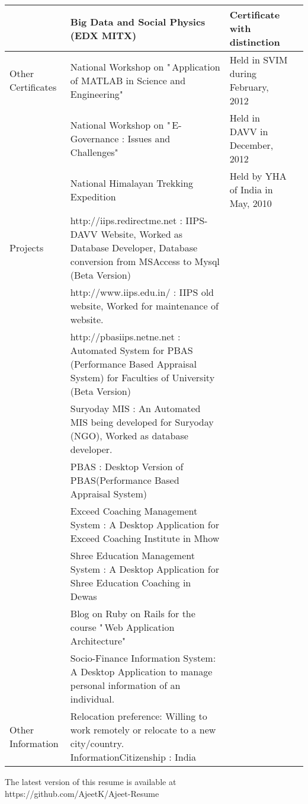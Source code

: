 \documentclass[12pt,a4paper]{article}
\begin{document}
\begin{table}[h]
\begin{tabular}{|l|l|l|l|}
\\
\hline
 & Big Data and Social Physics (EDX MITX) & Certificate with distinction 
\\
\hline
Other Certificates & National Workshop on "\,Application of MATLAB in 
Science and Engineering" & Held in SVIM during February, 2012 \\
\hline
 & National Workshop on "\,E-Governance : Issues and Challenges" & Held 
in DAVV in December, 2012 \\
\hline
 & National Himalayan Trekking Expedition & Held by YHA of India in May, 
2010 \\
\hline
Projects & http://iips.redirectme.net : IIPS-DAVV Website, Worked as 
Database Developer, Database conversion from MSAccess to Mysql (Beta 
Version) \\
\hline
 & http://www.iips.edu.in/ : IIPS old website, Worked for maintenance of 
website. \\
\hline
 & http://pbasiips.netne.net : Automated System for PBAS (Performance 
Based Appraisal System) for Faculties of University (Beta Version) \\
\hline
 & Suryoday MIS : An Automated MIS being developed for Suryoday (NGO), 
Worked as database developer. \\
\hline
 & PBAS : Desktop Version of PBAS(Performance Based Appraisal System) \\
\hline
 & Exceed Coaching Management System : A Desktop Application for Exceed 
Coaching Institute in Mhow \\
\hline
 & Shree Education Management System : A Desktop Application for Shree 
Education Coaching in Dewas \\
\hline
 & Blog on Ruby on Rails for the course "\,Web Application Architecture" 
\\
\hline
 & Socio-Finance Information System: A Desktop Application to manage 
personal information of an individual. \\
\hline
Other Information & Relocation preference: Willing to work remotely or 
relocate to a new city/country. InformationCitizenship : India \\
\hline
\end{tabular}
\end{table}


The latest version of this resume is available at 
https://github.com/AjeetK/Ajeet-Resume
\end{document}
